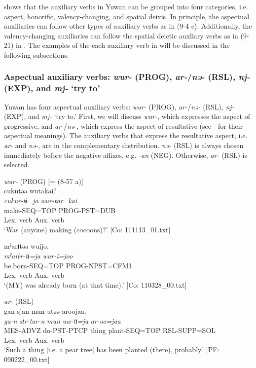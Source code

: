  shows that the auxiliary verbs in Yuwan can be grouped into four categories, i.e. aspect, honorific, valency-changing, and spatial deixis. In principle, the aspectual auxiliaries can follow other types of auxiliary verbs as in (9-4 c). Additionally, the valency-changing auxiliaries can follow the spatial deictic auxliary verbs as in (9-21) in . The examples of the each auxiliary verb in  will be discussed in the following subsections.

\subsubsection{Aspectual auxiliary verbs: \textit{wur-} (PROG), \textit{ar-}/\textit{nə-} (RSL), \textit{nj-} (EXP), and \textit{mj-} ‘try to’}\label{sec:9.1.1.1}

Yuwan has four aspectual auxiliary verbs: \textit{wur-} (PROG), \textit{ar-}/\textit{nə-} (RSL), \textit{nj-} (EXP), and \textit{mj-} ‘try to.’ First, we will discuss \textit{wur-}, which expresses the aspect of progressive, and \textit{ar-}/\textit{nə-}, which express the aspect of resultative (see  -  for their aspectual meanings). The auxiliary verbs that express the resultative aspect, i.e. \textit{ar-} and \textit{nə-}, are in the complementary distribution. \textit{nə-} (RSL) is always chosen immediately before the negative affixes, e.g. \textit{{}-an} (NEG). Otherwise, \textit{ar-} (RSL) is selected.

\ea   \textit{wur-} (PROG) \label{ex:9.7}
  \ea \label{ex:9.7a} [= (8-57 a)]\\
   \gllll     cukutəə  wutakai?\\
      \textit{cukur-tɨ=ja}  \textit{wur{}-tar=kai}\\
      make-SEQ=TOP  PROG-PST=DUB\\
      Lex. verb  Aux. verb\\
      \glt       ‘Was (anyone) making (cocoons)?’ [Co: 111113\_01.txt]

\ex \label{ex:9.7b} %
    \gllll  mˀarɨtəə  wuijo.\\
      \textit{mˀarɨr-tɨ=ja}  \textit{wur{}-i=joo}\\
      be.born-SEQ=TOP  PROG-NPST=CFM1\\
      Lex. verb  Aux. verb\\
      \glt       ‘(MY) was already born (at that time).’ [Co: 110328\_00.txt]

\ex \textit{ar-} (RSL)\label{ex:9.7c}\\
    \gllll     gan  sjan  mun  utəə  aroojaa.\\
      \textit{ga-n}  \textit{sɨr-tar-n}  \textit{mun}  \textit{uw-tɨ=ja}  \textit{ar{}-oo=jaa}\\
      MES-ADVZ  do-PST-PTCP  thing  plant-SEQ=TOP  RSL-SUPP=SOL\\
            Lex. verb  Aux. verb\\
      \glt       ‘Such a thing [i.e. a pear tree] has been planted (there), probably.’ [PF: 090222\_00.txt]
  
